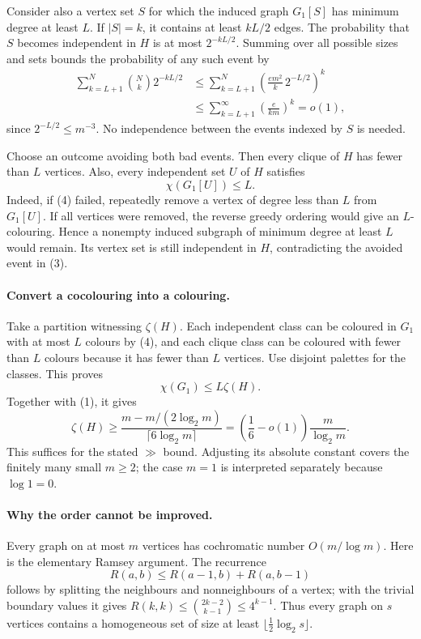 Consider also a vertex set \(S\) for which the induced graph \(G_1[S]\) has minimum degree at least \(L\). If \(|S|=k\), it contains at least \(kL/2\) edges. The probability that \(S\) becomes independent in \(H\) is at most \(2^{-kL/2}\). Summing over all possible sizes and sets bounds the probability of any such event by
\[
 \begin{aligned}
 \sum_{k=L+1}^{N}\binom Nk2^{-kL/2}
 &\leq\sum_{k=L+1}^{N}
       \left(\frac{e m^2}{k}\,2^{-L/2}\right)^k\\
 &\leq\sum_{k=L+1}^{\infty}\left(\frac{e}{km}\right)^k=o(1), \tag{3}
 \end{aligned}
\]
since \(2^{-L/2}\leq m^{-3}\). No independence between the events indexed by \(S\) is needed.

Choose an outcome avoiding both bad events. Then every clique of \(H\) has fewer than \(L\) vertices. Also, every independent set \(U\) of \(H\) satisfies
\[
 \chi(G_1[U])\leq L. \tag{4}
\]
Indeed, if (4) failed, repeatedly remove a vertex of degree less than \(L\) from \(G_1[U]\). If all vertices were removed, the reverse greedy ordering would give an \(L\)-colouring. Hence a nonempty induced subgraph of minimum degree at least \(L\) would remain. Its vertex set is still independent in \(H\), contradicting the avoided event in (3).

\paragraph{Convert a cocolouring into a colouring.}
Take a partition witnessing \(\zeta(H)\). Each independent class can be coloured in \(G_1\) with at most \(L\) colours by (4), and each clique class can be coloured with fewer than \(L\) colours because it has fewer than \(L\) vertices. Use disjoint palettes for the classes. This proves
\[
 \chi(G_1)\leq L\zeta(H).
\]
Together with (1), it gives
\[
 \zeta(H)\geq
 \frac{m-m/(2\log_2m)}{\lceil6\log_2m\rceil}
 =\left(\frac16-o(1)\right)\frac{m}{\log_2m}.
\]
This suffices for the stated \(\gg\) bound. Adjusting its absolute constant covers the finitely many small \(m\geq2\); the case \(m=1\) is interpreted separately because \(\log1=0\).

\paragraph{Why the order cannot be improved.}
Every graph on at most \(m\) vertices has cochromatic number \(O(m/\log m)\). Here is the elementary Ramsey argument. The recurrence
\[
 R(a,b)\leq R(a-1,b)+R(a,b-1)
\]
follows by splitting the neighbours and nonneighbours of a vertex; with the trivial boundary values it gives \(R(k,k)\leq\binom{2k-2}{k-1}\leq4^{k-1}\). Thus every graph on \(s\) vertices contains a homogeneous set of size at least \(\lfloor\tfrac12\log_2s\rfloor\).

